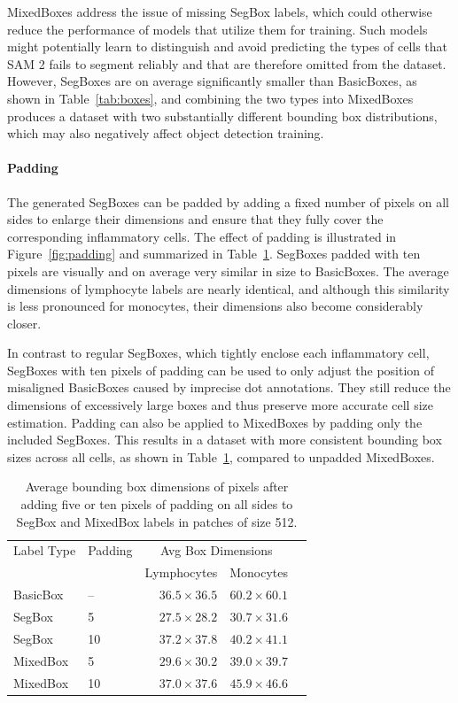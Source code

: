 MixedBoxes address the issue of missing SegBox labels, which could otherwise reduce the performance of models that utilize them for training. Such models might potentially learn to distinguish and avoid predicting the types of cells that SAM 2 fails to segment reliably and that are therefore omitted from the dataset. However, SegBoxes are on average significantly smaller than BasicBoxes, as shown in Table~\ref{tab:boxes}, and combining the two types into MixedBoxes produces a dataset with two substantially different bounding box distributions, which may also negatively affect object detection training.

\paragraph{Padding} The generated SegBoxes can be padded by adding a fixed number of pixels on all sides to enlarge their dimensions and ensure that they fully cover the corresponding inflammatory cells. The effect of padding is illustrated in Figure~\ref{fig:padding} and summarized in Table~\ref{tab:padding}. SegBoxes padded with ten pixels are visually and on average very similar in size to BasicBoxes. The average dimensions of lymphocyte labels are nearly identical, and although this similarity is less pronounced for monocytes, their dimensions also become considerably closer.

In contrast to regular SegBoxes, which tightly enclose each inflammatory cell, SegBoxes with ten pixels of padding can be used to only adjust the position of misaligned BasicBoxes caused by imprecise dot annotations. They still reduce the dimensions of excessively large boxes and thus preserve more accurate cell size estimation. Padding can also be applied to MixedBoxes by padding only the included SegBoxes. This results in a dataset with more consistent bounding box sizes across all cells, as shown in Table~\ref{tab:padding}, compared to unpadded MixedBoxes.

\begin{table}
    \centering
    \begin{tabular}{llrrr}
        \toprule
        Label Type & Padding & \multicolumn{2}{c}{Avg Box Dimensions} \\
        & & Lymphocytes & Monocytes \\
        \midrule
        BasicBox & -- & $36.5 \times 36.5$ & $60.2 \times 60.1$ \\
        \midrule
        SegBox & 5 & $27.5 \times 28.2$ & $30.7 \times 31.6$ \\
        SegBox & 10 & $37.2 \times 37.8$ & $40.2 \times 41.1$ \\
        \midrule
        MixedBox & 5 & $29.6 \times 30.2$ & $39.0 \times 39.7$ \\
        MixedBox & 10 & $37.0 \times 37.6$ & $45.9 \times 46.6$ \\
        \bottomrule
    \end{tabular}
    \caption{Average bounding box dimensions of pixels after adding five or ten pixels of padding on all sides to SegBox and MixedBox labels in patches of size 512.}
    \label{tab:padding}
\end{table}

